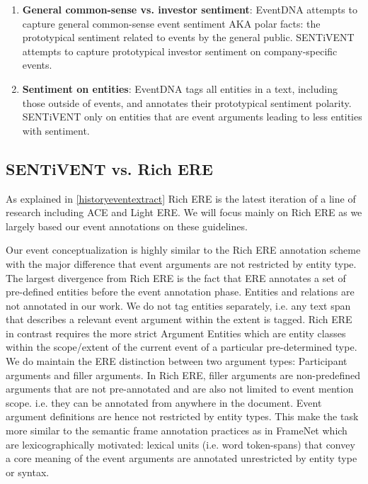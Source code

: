 \begin{enumerate}[wide, labelwidth=!, nolistsep, label=\alph*)]
\item \textbf{General common-sense vs. investor sentiment}: EventDNA attempts to capture general common-sense event sentiment AKA polar facts: the prototypical sentiment related to events by the general public. SENTiVENT attempts to capture prototypical investor sentiment on company-specific events. %

\item \textbf{Sentiment on entities}: EventDNA tags all entities in a text, including those outside of events, and annotates their prototypical sentiment polarity. SENTiVENT only on entities that are event arguments leading to less entities with sentiment.
\end{enumerate}

\subsection{SENTiVENT vs. Rich ERE}
As explained in \ref{historyeventextract} Rich ERE is the latest iteration of a line of research including ACE and Light ERE.  %
We will focus mainly on Rich ERE as we largely based our event annotations on these guidelines.

Our event conceptualization is highly similar to the Rich ERE annotation scheme with the major difference that event arguments are not restricted by entity type.
The largest divergence from Rich ERE is the fact that ERE annotates a set of pre-defined entities before the event annotation phase.
Entities and relations are not annotated in our work.
We do not tag entities separately, i.e. any text span that describes a relevant event argument within the extent is tagged.
Rich ERE in contrast requires the more strict Argument Entities which are entity classes within the scope/extent of the current event of a particular pre-determined type.
We do maintain the ERE distinction between two argument types: Participant arguments and filler arguments.
In Rich ERE, filler arguments are non-predefined arguments that are not pre-annotated and are also not limited to event mention scope. i.e. they can be annotated from anywhere in the document.
Event argument definitions are hence not restricted by entity types.
This make the task more similar to the semantic frame annotation practices as in FrameNet \cite[Chapter~3]{ruppenhofer2010framenet} which are lexicographically motivated: lexical units (i.e. word token-spans) that convey a core meaning of the event arguments are annotated unrestricted by entity type or syntax.

